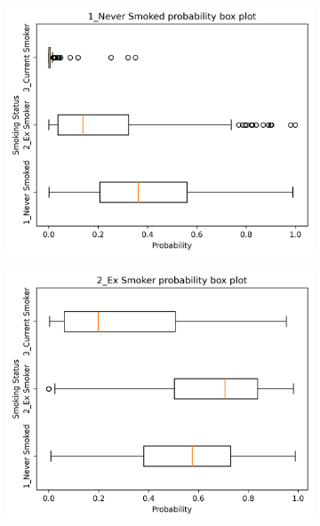 \documentclass{article} %
\begin{document}
\begin{figure}[htb]
    \centering
    \begin{subfigure}{0.48\linewidth}
        \centering
        \includegraphics[width=\linewidth]{cohort2/test_boxplot_1.png}
    \end{subfigure}
    \hfill
    \begin{subfigure}{0.48\linewidth}
        \centering
        \includegraphics[width=\linewidth]{cohort2/test_boxplot_2.png}
    \end{subfigure}
    \begin{subfigure}{0.48\linewidth}

\end{subfigure}
\end{figure}
\end{document}
